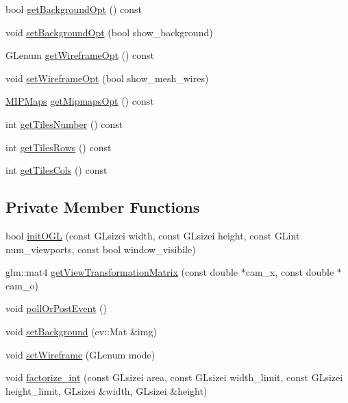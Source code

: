 \begin{DoxyCompactItemize}
\item 
bool \mbox{\hyperlink{classSICAD_a170bd325654aed9eb81062ac610608fa}{get\+Background\+Opt}} () const
\item 
void \mbox{\hyperlink{classSICAD_a07921943ad3d4016dcbe76135e799754}{set\+Background\+Opt}} (bool show\+\_\+background)
\item 
G\+Lenum \mbox{\hyperlink{classSICAD_af65b5ad73e2c0e872face157b56bd68b}{get\+Wireframe\+Opt}} () const
\item 
void \mbox{\hyperlink{classSICAD_a4cf80a273b6b0d946cd298472c63ddd4}{set\+Wireframe\+Opt}} (bool show\+\_\+mesh\+\_\+wires)
\item 
\mbox{\hyperlink{classSICAD_a7e092dede6f660355462d6d548214198}{M\+I\+P\+Maps}} \mbox{\hyperlink{classSICAD_a8033a99745f595ea5205e3830cabc389}{get\+Mipmaps\+Opt}} () const
\item 
int \mbox{\hyperlink{classSICAD_a728f82ebbfeea54f3fef2fc0c56a4964}{get\+Tiles\+Number}} () const
\item 
int \mbox{\hyperlink{classSICAD_a9e3dd48dfd83ea0bd00d64dacc4fbd40}{get\+Tiles\+Rows}} () const
\item 
int \mbox{\hyperlink{classSICAD_a2ba3a0aeb3dab9996bdeed19a16eae56}{get\+Tiles\+Cols}} () const
\end{DoxyCompactItemize}
\subsection*{Private Member Functions}
\begin{DoxyCompactItemize}
\item 
bool \mbox{\hyperlink{classSICAD_a102619690ab32e300405d22d52e36a5e}{init\+O\+GL}} (const G\+Lsizei width, const G\+Lsizei height, const G\+Lint num\+\_\+viewports, const bool window\+\_\+visibile)
\item 
glm\+::mat4 \mbox{\hyperlink{classSICAD_a1bdece095865249df4cb4e6a7ad2901e}{get\+View\+Transformation\+Matrix}} (const double $\ast$cam\+\_\+x, const double $\ast$cam\+\_\+o)
\item 
void \mbox{\hyperlink{classSICAD_a8238a2b2c488c8b7ba85d5b2a0bf00ac}{poll\+Or\+Post\+Event}} ()
\item 
void \mbox{\hyperlink{classSICAD_a25b180f54f2e93d69b291cc225600c8e}{set\+Background}} (cv\+::\+Mat \&img)
\item 
void \mbox{\hyperlink{classSICAD_ae7af7aba5d81b9f1cc3e273a55811a70}{set\+Wireframe}} (G\+Lenum mode)
\item 
void \mbox{\hyperlink{classSICAD_a2603ec5cb9a31bc7be0a335ef513ab0d}{factorize\+\_\+int}} (const G\+Lsizei area, const G\+Lsizei width\+\_\+limit, const G\+Lsizei height\+\_\+limit, G\+Lsizei \&width, G\+Lsizei \&height)
\end{DoxyCompactItemize}
